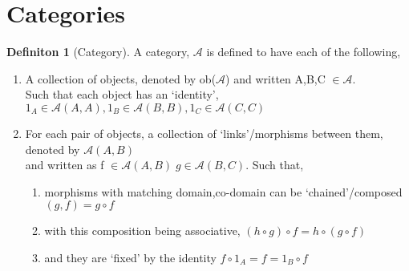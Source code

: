 \documentclass{article}
\theoremstyle{definition}
\theoremstyle{definition}
\newtheorem{definition}{Definiton}[section]
\begin{document}
\section{Categories} \label{sec:Categories}
\begin{definition}[Category] %
A category, $\mathcal{A}$ is defined to have each of the following,
\begin{enumerate}[label=(\roman*)]
	\item A collection of objects, denoted by ob($\mathcal{A}$) and written A,B,C $\in \mathcal{A}$.\\
		Such that each object has an `identity', $ 1_A \in \mathcal{A}(A,A) , 1_B \in \mathcal{A}(B,B), 1_C \in \mathcal{A}(C,C)$
	\item For each pair of objects, a collection of `links'/morphisms between them, denoted by $\mathcal{A}(A,B)$ \\and written as f $ \in \mathcal{A}(A,B) \; g \in \mathcal{A}(B,C) $. Such that,
		\begin{enumerate}[label=(\alph*)]
			\item morphisms with matching domain,co-domain can be `chained'/composed $ (g,f)=g \circ f $
			\item with this composition being associative, $ (h \circ g)\circ f=h \circ ( g \circ f) $
			\item and they are `fixed' by the identity $ f \circ 1_A =f= 1_B \circ f $
		\end{enumerate}
\end{enumerate}
\end{definition}
\end{document}
